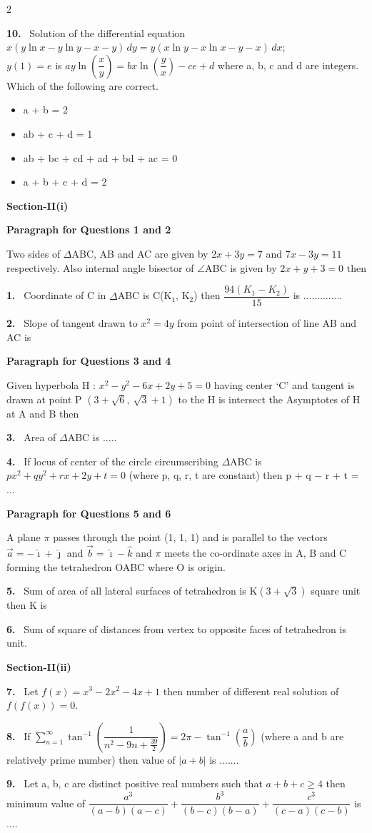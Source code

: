 \documentclass[10pt]{extarticle}
\newcommand{\sect}[1]{\par\smallskip\noindent\textbf{#1}\par}
\newcommand{\qn}[1]{\par\smallskip\noindent\textbf{#1.}~}
\newcommand{\paraq}[2]{\par\smallskip\noindent\textbf{Paragraph for Questions #1 and #2}\par}
\newenvironment{qoptions}{\begin{itemize}[leftmargin=1.8em,itemsep=1pt,topsep=2pt,label={}]}{\end{itemize}}
\newcommand{\opt}[2]{\item[(#1)] #2}
\begin{document}
\begin{multicols}{2}
\qn{10} Solution of the differential equation\\
$x(y\ln x-y\ln y-x-y)\,dy=y(x\ln y-x\ln x-y-x)\,dx$;\\
$y(1)=e$ is $ay\ln\left(\dfrac xy\right)=bx\ln\left(\dfrac yx\right)-ce+d$ where a, b, c and d are integers. Which of the following are correct.
\begin{qoptions}
\opt{A}{a + b = 2}
\opt{B}{ab + c + d = 1}
\opt{C}{ab + bc + cd + ad + bd + ac = 0}
\opt{D}{a + b + c + d = 2}
\end{qoptions}

\sect{Section-II(i)}

\paraq{1}{2}
Two sides of $\Delta$ABC, AB and AC are given by $2x+3y=7$ and $7x-3y=11$ respectively. Also internal angle bisector of $\angle$ABC is given by $2x+y+3=0$ then

\qn{1} Coordinate of C in $\Delta$ABC is C(K$_1$, K$_2$) then $\dfrac{94(K_1-K_2)}{15}$ is ..............

\qn{2} Slope of tangent drawn to $x^2=4y$ from point of intersection of line AB and AC is

\paraq{3}{4}
Given hyperbola H : $x^2-y^2-6x+2y+5=0$ having center `C' and tangent is drawn at point P $\left(3+\sqrt6,\ \sqrt3+1\right)$ to the H is intersect the Asymptotes of H at A and B then

\qn{3} Area of $\Delta$ABC is .....

\qn{4} If locus of center of the circle circumscribing $\Delta$ABC is $px^2+qy^2+rx+2y+t=0$ (where p, q, r, t are constant) then p + q $-$ r + t = ...

\paraq{5}{6}
A plane $\pi$ passes through the point (1, 1, 1) and is parallel to the vectors $\vec a=-\hat\imath+\hat\jmath$ and $\vec b=\hat\imath-\hat k$ and $\pi$ meets the co-ordinate axes in A, B and C forming the tetrahedron OABC where O is origin.

\qn{5} Sum of area of all lateral surfaces of tetrahedron is K$\left(3+\sqrt3\right)$ square unit then K is \underline{\hspace{1cm}}

\qn{6} Sum of square of distances from vertex to opposite faces of tetrahedron is \underline{\hspace{1cm}} unit.

\sect{Section-II(ii)}

\qn{7} Let $f(x)=x^3-2x^2-4x+1$ then number of different real solution of $f(f(x))=0$.

\qn{8} If $\displaystyle\sum_{n=1}^{\infty}\tan^{-1}\left(\dfrac{1}{n^2-9n+\frac{39}{2}}\right)=2\pi-\tan^{-1}\left(\dfrac ab\right)$ (where a and b are relatively prime number) then value of $|a+b|$ is .......

\qn{9} Let a, b, c are distinct positive real numbers such that $a+b+c\ge4$ then minimum value of $\dfrac{a^3}{(a-b)(a-c)}+\dfrac{b^3}{(b-c)(b-a)}+\dfrac{c^3}{(c-a)(c-b)}$ is ....

\end{multicols}
\end{document}
